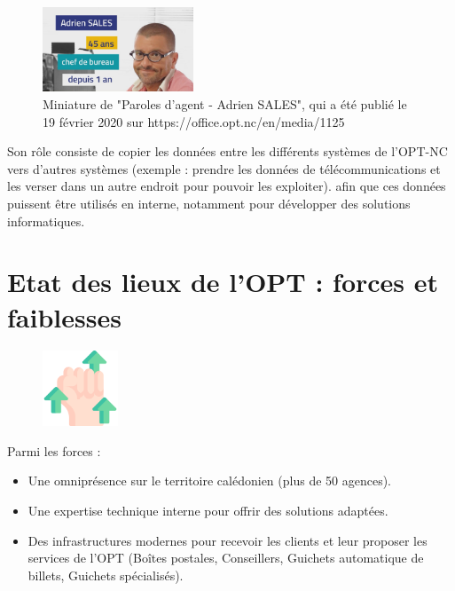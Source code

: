 \documentclass[12pt,a4paper]{report}
\begin{document}
\vspace{1cm}
\begin{figure}[h] %
    \centering
    \includegraphics[width=0.4\textwidth]{ressources_rapport/paroles_agent.jpg}
    \caption{Miniature de "Paroles d'agent - Adrien SALES", qui a été publié le 19 février 2020 sur https://office.opt.nc/en/media/1125}
\end{figure}
Son rôle consiste de copier les données entre les différents systèmes de l'OPT-NC vers d'autres systèmes (exemple : prendre les données de télécommunications et les verser dans un autre endroit pour pouvoir les exploiter). afin que ces données puissent être utilisés en interne, notamment pour développer des solutions informatiques.
\newpage

\section{Etat des lieux de l'OPT : forces et faiblesses}
\begin{figure}[h] %
    \centering
    \includegraphics[width=0.2\textwidth]{ressources_rapport/forces.png}
\end{figure}
Parmi les forces : 
\begin{itemize}
    \item Une omniprésence sur le territoire calédonien (plus de 50 agences).
    \item Une expertise technique interne pour offrir des solutions adaptées.
    \item Des infrastructures modernes pour recevoir les clients et leur proposer les services de l'OPT (Boîtes postales, Conseillers, Guichets automatique de billets, Guichets spécialisés).
\end{itemize}
\end{document}
